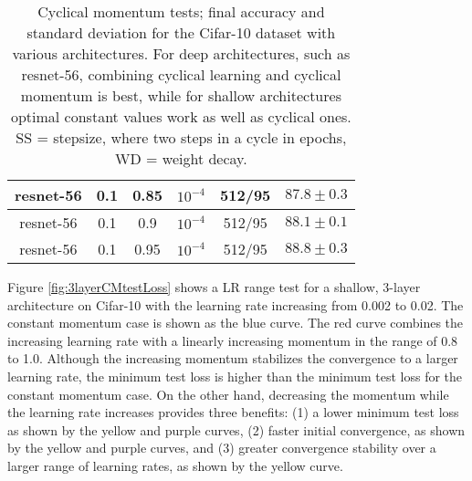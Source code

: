 \documentclass{article} %
\begin{document}
\begin{table}[tb]
\begin{center}
\begin{tabular}{| c | c | c | c | c | c | }
			resnet-56  & 0.1  & 0.85 & $ 10^{-4} $ & 512/95 & $ 87.8 \pm 0.3 $   \\ \hline
			resnet-56  & 0.1  & 0.9 & $ 10^{-4} $ & 512/95 & $ 88.1 \pm 0.1 $   \\ \hline
			resnet-56  & 0.1  & 0.95 & $ 10^{-4} $ & 512/95 & $ 88.8 \pm 0.3 $   \\ \hline
		\end{tabular}
		\caption{Cyclical momentum tests; final accuracy and standard deviation for the Cifar-10 dataset with various architectures. For deep architectures, such as resnet-56, combining cyclical learning and cyclical momentum is best, while for shallow architectures optimal constant values work as well as cyclical ones.   SS = stepsize, where two steps in a cycle in epochs, WD = weight decay. }
		\label{tab1:CMcifar}
		\vspace{-20pt}
	\end{center}
	\vspace{-5pt}
\end{table}

Figure \ref{fig:3layerCMtestLoss} shows a LR range test for a shallow, 3-layer architecture on Cifar-10 with the learning rate increasing from 0.002 to 0.02.  The constant momentum case is shown as the blue curve.  The red curve combines the increasing learning rate with a linearly increasing momentum in the range of 0.8 to 1.0.  Although the increasing momentum stabilizes the convergence to a larger learning rate, the minimum test loss is higher than the minimum test loss for the constant momentum case.  On the other hand, decreasing the momentum while the learning rate increases provides three benefits: (1) a lower minimum test loss as shown by the yellow and purple curves, (2) faster initial convergence, as shown by the yellow and purple curves, and (3) greater convergence stability over a larger range of learning rates, as shown by the yellow curve.
\end{document}
